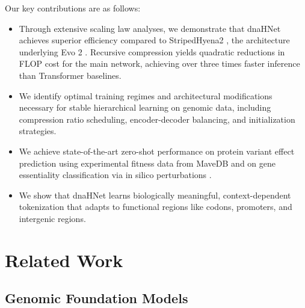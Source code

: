 \documentclass{article}
\theoremstyle{plain}
\theoremstyle{definition}
\theoremstyle{remark}
\begin{document}
Our key contributions are as follows:
\begin{itemize}[leftmargin=10pt, itemsep=3pt]

    \item Through extensive scaling law analyses, we demonstrate that dnaHNet achieves superior efficiency compared to StripedHyena2 \citep{ku2025systemsalgorithmsconvolutionalmultihybrid}, the architecture underlying Evo 2 \citep{Brixi2025.02.18.638918}. Recursive compression yields quadratic reductions in FLOP cost for the main network, achieving over three times faster inference than Transformer baselines.

    \item We identify optimal training regimes and architectural modifications necessary for stable hierarchical learning on genomic data, including compression ratio scheduling, encoder-decoder balancing, and initialization strategies.

    \item We achieve state-of-the-art zero-shot performance on protein variant effect prediction using experimental fitness data from MaveDB \citep{Esposito2019, Rubin2025} and on gene essentiality classification via in silico perturbations \citep{Brixi2025.02.18.638918}. 

    \item We show that dnaHNet learns biologically meaningful, context-dependent tokenization that adapts to functional regions like codons, promoters, and intergenic regions.

\end{itemize}



\section{Related Work}

\subsection{Genomic Foundation Models}
\end{document}
